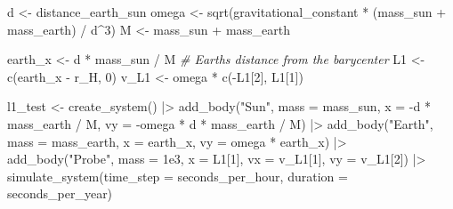 \documentclass[
  10.5pt,
  letterpaper,
]{scrbook}
\newenvironment{Shaded}{\begin{snugshade}}{\end{snugshade}}
\newcommand{\AttributeTok}[1]{\textcolor[rgb]{0.00,0.00,0.00}{#1}}
\newcommand{\CommentTok}[1]{\textcolor[rgb]{0.00,0.00,0.00}{\textit{#1}}}
\newcommand{\DecValTok}[1]{\textcolor[rgb]{0.00,0.00,0.00}{#1}}
\newcommand{\FloatTok}[1]{\textcolor[rgb]{0.00,0.00,0.00}{#1}}
\newcommand{\FunctionTok}[1]{\textcolor[rgb]{0.00,0.00,0.00}{#1}}
\newcommand{\NormalTok}[1]{\textcolor[rgb]{0.00,0.00,0.00}{#1}}
\newcommand{\OtherTok}[1]{\textcolor[rgb]{0.00,0.00,0.00}{#1}}
\newcommand{\SpecialCharTok}[1]{\textcolor[rgb]{0.00,0.00,0.00}{#1}}
\newcommand{\StringTok}[1]{\textcolor[rgb]{0.00,0.00,0.00}{#1}}
\theoremstyle{plain}
\theoremstyle{remark}
\begin{document}
\begin{Shaded}
\begin{Highlighting}[]
\NormalTok{d     }\OtherTok{\textless{}{-}}\NormalTok{ distance\_earth\_sun}
\NormalTok{omega }\OtherTok{\textless{}{-}} \FunctionTok{sqrt}\NormalTok{(gravitational\_constant }\SpecialCharTok{*}\NormalTok{ (mass\_sun }\SpecialCharTok{+}\NormalTok{ mass\_earth) }\SpecialCharTok{/}\NormalTok{ d}\SpecialCharTok{\^{}}\DecValTok{3}\NormalTok{)}
\NormalTok{M     }\OtherTok{\textless{}{-}}\NormalTok{ mass\_sun }\SpecialCharTok{+}\NormalTok{ mass\_earth}

\NormalTok{earth\_x }\OtherTok{\textless{}{-}}\NormalTok{ d }\SpecialCharTok{*}\NormalTok{ mass\_sun }\SpecialCharTok{/}\NormalTok{ M           }\CommentTok{\# Earth\textquotesingle{}s distance from the barycenter}
\NormalTok{L1      }\OtherTok{\textless{}{-}} \FunctionTok{c}\NormalTok{(earth\_x }\SpecialCharTok{{-}}\NormalTok{ r\_H, }\DecValTok{0}\NormalTok{)}
\NormalTok{v\_L1    }\OtherTok{\textless{}{-}}\NormalTok{ omega }\SpecialCharTok{*} \FunctionTok{c}\NormalTok{(}\SpecialCharTok{{-}}\NormalTok{L1[}\DecValTok{2}\NormalTok{], L1[}\DecValTok{1}\NormalTok{])}

\NormalTok{l1\_test }\OtherTok{\textless{}{-}} \FunctionTok{create\_system}\NormalTok{() }\SpecialCharTok{|\textgreater{}}
  \FunctionTok{add\_body}\NormalTok{(}\StringTok{"Sun"}\NormalTok{,   }\AttributeTok{mass =}\NormalTok{ mass\_sun,   }\AttributeTok{x =} \SpecialCharTok{{-}}\NormalTok{d }\SpecialCharTok{*}\NormalTok{ mass\_earth }\SpecialCharTok{/}\NormalTok{ M,}
           \AttributeTok{vy =} \SpecialCharTok{{-}}\NormalTok{omega }\SpecialCharTok{*}\NormalTok{ d }\SpecialCharTok{*}\NormalTok{ mass\_earth }\SpecialCharTok{/}\NormalTok{ M) }\SpecialCharTok{|\textgreater{}}
  \FunctionTok{add\_body}\NormalTok{(}\StringTok{"Earth"}\NormalTok{, }\AttributeTok{mass =}\NormalTok{ mass\_earth, }\AttributeTok{x =}\NormalTok{ earth\_x, }\AttributeTok{vy =}\NormalTok{ omega }\SpecialCharTok{*}\NormalTok{ earth\_x) }\SpecialCharTok{|\textgreater{}}
  \FunctionTok{add\_body}\NormalTok{(}\StringTok{"Probe"}\NormalTok{, }\AttributeTok{mass =} \FloatTok{1e3}\NormalTok{, }\AttributeTok{x =}\NormalTok{ L1[}\DecValTok{1}\NormalTok{], }\AttributeTok{vx =}\NormalTok{ v\_L1[}\DecValTok{1}\NormalTok{], }\AttributeTok{vy =}\NormalTok{ v\_L1[}\DecValTok{2}\NormalTok{]) }\SpecialCharTok{|\textgreater{}}
  \FunctionTok{simulate\_system}\NormalTok{(}\AttributeTok{time\_step =}\NormalTok{ seconds\_per\_hour, }\AttributeTok{duration =}\NormalTok{ seconds\_per\_year)}
\end{Highlighting}
\end{Shaded}
\end{document}
